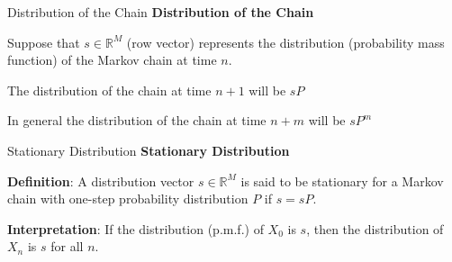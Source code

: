 \documentclass[8pt]{beamer}
\begin{document}
\begin{frame}{Distribution of the Chain}
\textbf{Distribution of the Chain}

\vspace{3mm}

Suppose that $s \in \mathbb{R}^M$ (row vector) represents the distribution (probability mass function) of the Markov chain at time $n$.\\
\vspace{3mm}

The distribution of the chain at time $n+1$ will be $sP$

\vspace{3mm}

In general the distribution of the chain at time $n+m$ will be $sP^m$
\end{frame}

\begin{frame}{Stationary Distribution}
\textbf{Stationary Distribution}

\vspace{3mm}

\textbf{Definition}:  A distribution vector $s \in \mathbb{R}^M$ is said to be stationary for a Markov chain with one-step probability distribution $P$ if $s=sP$.

\vspace{3mm}

\textbf{Interpretation}: If the distribution (p.m.f.) of $X_0$ is  $s$, then the distribution of $X_n$ is $s$ for all $n$.
\end{frame}
\end{document}
